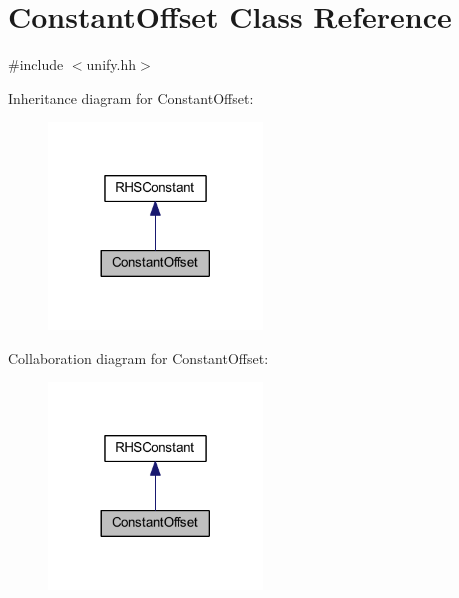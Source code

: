 \hypertarget{class_constant_offset}{}\section{Constant\+Offset Class Reference}
\label{class_constant_offset}


{\ttfamily \#include $<$unify.\+hh$>$}



Inheritance diagram for Constant\+Offset\+:
\nopagebreak
\begin{figure}[H]
\begin{center}
\leavevmode
\includegraphics[width=161pt]{class_constant_offset__inherit__graph}
\end{center}
\end{figure}


Collaboration diagram for Constant\+Offset\+:
\nopagebreak
\begin{figure}[H]
\begin{center}
\leavevmode
\includegraphics[width=161pt]{class_constant_offset__coll__graph}
\end{center}
\end{figure}
